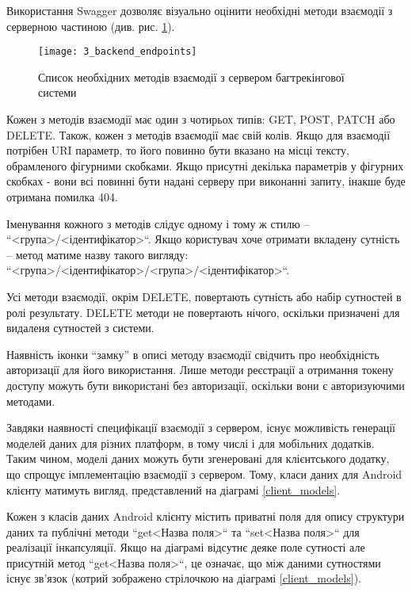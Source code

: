 \documentclass[../main.tex]{subfiles}
\begin{document}
		Використання Swagger дозволяє візуально оцінити необхідні методи взаємодії з серверною частиною (див. рис. \ref{available_rest_endpoints}).
		
		\begin{figure}[H]
			\centering
			\texttt{[image: 3\_backend\_endpoints]}
			\caption{Список необхідних методів взаємодії з сервером багтрекінгової системи}
			\label{available_rest_endpoints}
		\end{figure}
		
		Кожен з методів взаємодії має один з чотирьох типів: GET, POST, PATCH або DELETE. Також, кожен з методів взаємодії має свій колів. Якщо для взаємодії потрібен URI параметр, то його повинно бути вказано на місці тексту, обрамленого фігурними скобками. Якщо присутні декілька параметрів у фігурних скобках - вони всі повинні бути надані серверу при виконанні запиту, інакше буде отримана помилка 404.
		
		Іменування кожного з методів слідує одному і тому ж стилю -- ``<група>/<ідентифікатор>``. Якщо користувач хоче отримати вкладену сутність -- метод матиме назву такого вигляду: ``<група>/<ідентифікатор>/<група>/<ідентифікатор>``.
		
		Усі методи взаємодії, окрім DELETE, повертають сутність або набір сутностей в ролі результату. DELETE методи не повертають нічого, оскільки призначені для видаленя сутностей з системи.
		
		Наявність іконки \enquote{замку} в описі методу взаємодії свідчить про необхідність авторизації для його використання. Лише методи реєстрації а отримання токену доступу можуть бути використані без авторизації, оскільки вони є авторизуючими методами.
		
		Завдяки наявності специфікації взаємодії з сервером, існує можливість генерації моделей даних для різних платформ, в тому числі і для мобільних додатків. Таким чином, моделі даних можуть бути згенеровані для клієнтського додатку, що спрощує імплементацію взаємодії з сервером. Тому, класи даних для Android клієнту матимуть вигляд, представлений на діаграмі \ref{client_models}.
		
		Кожен з класів даних Android клієнту містить приватні поля для опису структури даних та публічні методи ``get<Назва поля>`` та ``set<Назва поля>`` для реалізації інкапсуляції. Якщо на діаграмі відсутнє деяке поле сутності але присутній метод ``get<Назва поля>``, це означає, що між даними сутностями існує зв'язок (котрий зображено стрілочкою на діаграмі \ref{client_models}).
		
\end{document}
